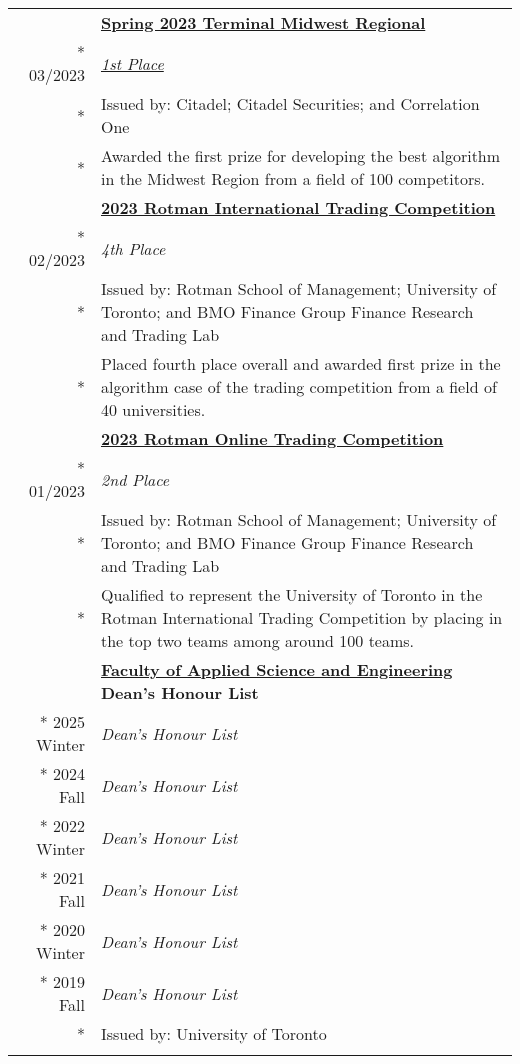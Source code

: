 \documentclass{article}
\begin{document}
	\begin{tabularx}{\textwidth}{r X}
		& \textbf{\href{https://terminal.c1games.com/}{Spring 2023 Terminal Midwest Regional}} \\*
		03/2023 & \textit{\href{https://www.credential.net/950d22c3-1b72-45d8-bf12-732c7ff54927}{1st Place}} \\*
		& {\small Issued by: Citadel; Citadel Securities; and Correlation One} \\*
		& {\small Awarded the first prize for developing the best algorithm in the Midwest Region from a field of 100 competitors.} \\
		\addlinespace
		& \textbf{\href{https://ritc.rotman.utoronto.ca/}{2023 Rotman International Trading Competition}} \\*
		02/2023 & \textit{4th Place} \\*
		& {\small Issued by: Rotman School of Management; University of Toronto; and BMO Finance Group Finance Research and Trading Lab} \\*
		& {\small Placed fourth place overall and awarded first prize in the algorithm case of the trading competition from a field of 40 universities.} \\
		\iftoggle{verbose}{
			\addlinespace
			& \textbf{\href{https://inside.rotman.utoronto.ca/financelab/}{2023 Rotman Online Trading Competition}} \\*
			01/2023 & \textit{2nd Place} \\*
			& {\small Issued by: Rotman School of Management; University of Toronto; and BMO Finance Group Finance Research and Trading Lab} \\*
			& {\small Qualified to represent the University of Toronto in the Rotman International Trading Competition by placing in the top two teams among around 100 teams.} \\
			\addlinespace
			& \textbf{\href{https://www.engineering.utoronto.ca/}{Faculty of Applied Science and Engineering} Dean's Honour List} \\*
			2025 Winter & \textit{Dean's Honour List} \\*
			2024 Fall & \textit{Dean's Honour List} \\*
			2022 Winter & \textit{Dean's Honour List} \\*
			2021 Fall & \textit{Dean's Honour List} \\*
			2020 Winter & \textit{Dean's Honour List} \\*
			2019 Fall & \textit{Dean's Honour List} \\*
			& {\small Issued by: University of Toronto} \\

}
\end{tabularx}
\end{document}
